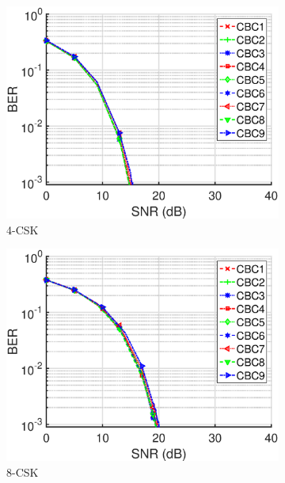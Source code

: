 \documentclass[10pt,letterpaper]{article}
\begin{document}
\begin{figure}[b]
	\centering
		\begin{subfigure}{0.49\textwidth}
		\centering
			\includegraphics[trim={0.1in 0.0in 0.6in 0.3in}, clip=true, width=\textwidth]{M04_4-CSK_BERvsSNR.eps}
			\caption{4-CSK}
			\label{fig4SNR}
		\end{subfigure}
		\hfill
		\begin{subfigure}{0.49\textwidth}
		\centering
			\includegraphics[trim={0.1in 0.0in 0.6in 0.3in}, clip=true, width=\textwidth]{M08_8-CSK_BERvsSNR.eps}
			\caption{8-CSK}
			\label{fig8SNR}
		\end{subfigure}
		\vfill
		\begin{subfigure}{0.49\textwidth}

\end{subfigure}
\end{figure}
\end{document}
